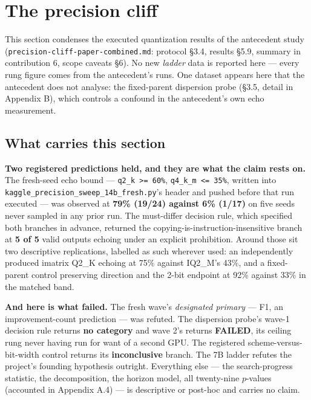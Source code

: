 \section{The precision cliff}

This section condenses the executed quantization results of the antecedent study (\texttt{precision-cliff-paper-combined.md}: protocol \S3.4, results \S5.9, summary in contribution 6, scope caveats \S6). No new \emph{ladder} data is reported here --- every rung figure comes from the antecedent's runs. One dataset appears here that the antecedent does not analyse: the fixed-parent dispersion probe (\S3.5, detail in Appendix B), which controls a confound in the antecedent's own echo measurement.

\subsection{What carries this section}

\textbf{Two registered predictions held, and they are what the claim rests on.} The fresh-seed echo bound --- \texttt{q2\_k >= 60\%}, \texttt{q4\_k\_m <= 35\%}, written into \texttt{kaggle\_precision\_sweep\_14b\_fresh.py}'s header and pushed before that run executed --- was observed at \textbf{79\% (19/24) against 6\% (1/17)} on five seeds never sampled in any prior run. The must-differ decision rule, which specified both branches in advance, returned the copying-is-instruction-insensitive branch at \textbf{5 of 5} valid outputs echoing under an explicit prohibition. Around those sit two descriptive replications, labelled as such wherever used: an independently produced imatrix Q2\_K echoing at 75\% against IQ2\_M's 43\%, and a fixed-parent control preserving direction and the 2-bit endpoint at 92\% against 33\% in the matched band.

\textbf{And here is what failed.} The fresh wave's \emph{designated primary} --- F1, an improvement-count prediction --- was refuted. The dispersion probe's wave-1 decision rule returns \textbf{no category} and wave 2's returns \textbf{FAILED}, its ceiling rung never having run for want of a second GPU. The registered scheme-versus-bit-width control returns its \textbf{inconclusive} branch. The 7B ladder refutes the project's founding hypothesis outright. Everything else --- the search-progress statistic, the decomposition, the horizon model, all twenty-nine $p$-values (accounted in Appendix A.4) --- is descriptive or post-hoc and carries no claim.

